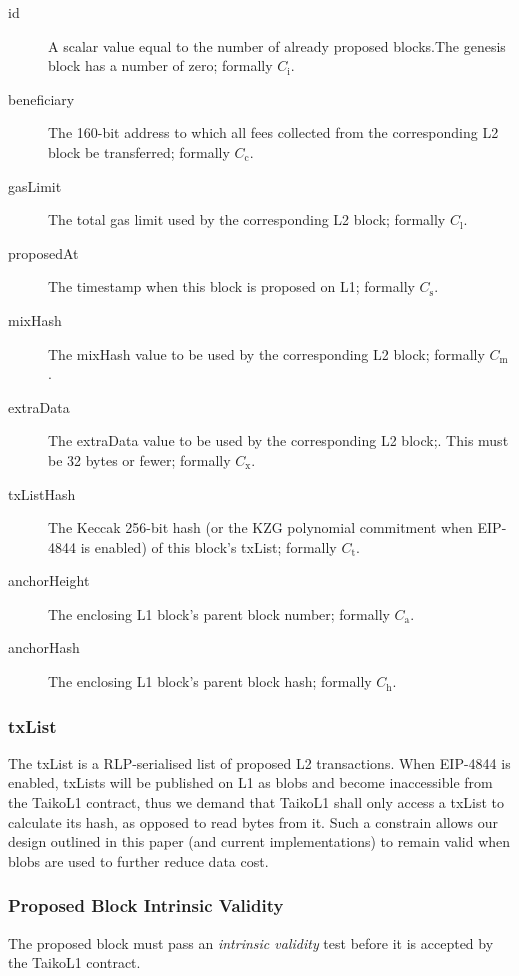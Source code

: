 \documentclass[9pt,oneside]{amsart}
\begin{document}
\begin{multicols}{2}
\begin{description}
\item[id] A scalar value equal to the number of already proposed blocks.The genesis block has a number of zero; formally $C_{\mathrm{i}}$.
\item[beneficiary] The 160-bit address to which all fees collected from the corresponding L2 block be transferred; formally $C_{\mathrm{c}}$.
\item[gasLimit] The total gas limit used by the corresponding L2 block; formally $C_{\mathrm{l}}$.
\item[proposedAt] The timestamp when this block is proposed on L1; formally $C_{\mathrm{s}}$.
\item[mixHash] The mixHash value to be used by the corresponding L2 block; formally $C_{\mathrm{m}}$.
\item[extraData] The extraData value to be used by the corresponding L2 block;. This must be 32 bytes or fewer; formally $C_{\mathrm{x}}$.
\item[txListHash] The Keccak 256-bit hash (or the KZG polynomial commitment when EIP-4844 is enabled) of this block's txList; formally $C_{\mathrm{t}}$. 
\item[anchorHeight] The enclosing L1 block's parent block number; formally $C_{\mathrm{a}}$.
\item[anchorHash] The enclosing L1 block's parent block hash; formally $C_{\mathrm{h}}$.
\end{description}

\subsubsection{txList}\label{sec:txlist}
The txList is a RLP-serialised list of proposed L2 transactions. When EIP-4844 is enabled, txLists will be published on L1 as blobs and become inaccessible from the TaikoL1 contract, thus we demand that TaikoL1 shall only access a txList to calculate its hash, as opposed to read bytes from it. Such a constrain allows our design outlined in this paper (and current implementations) to remain valid when blobs are used to further reduce data cost.




\subsubsection{Proposed Block Intrinsic Validity}
The proposed block must pass an \textit{intrinsic validity} test before it is accepted by the TaikoL1 contract. 


\end{multicols}
\end{document}
